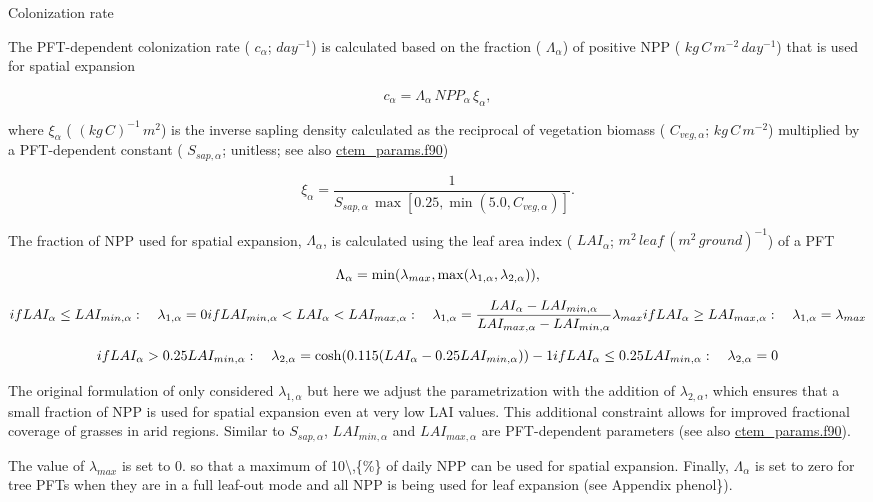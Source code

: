 Colonization rate

The P\+F\+T-\/dependent colonization rate ( $c_\alpha$; $day^{-1}$) is calculated based on the fraction ( $\Lambda_\alpha$) of positive N\+P\+P ( $kg\,C\,m^{-2}\,day^{-1}$) that is used for spatial expansion

\[ \label{c_a} c_\alpha = {\Lambda_\alpha\, NPP_\alpha\,\xi_{\alpha}}, \]

where $\xi_{\alpha}$ ( $(kg\,C)^{-1}\,m^{2}$) is the inverse sapling density calculated as the reciprocal of vegetation biomass ( $C_{veg,\alpha}$; $kg\,C\,m^{-2}$) multiplied by a P\+F\+T-\/dependent constant ( $S_{sap,\alpha}$; unitless; see also \hyperlink{ctem__params_8f90}{ctem\+\_\+params.\+f90})

\[ \label{xi} \xi_{\alpha}=\frac{1}{S_{sap,\alpha}\,\max[0.25,\min(5.0, C_{veg,\alpha})]}. \]

The fraction of N\+P\+P used for spatial expansion, $\Lambda_\alpha$, is calculated using the leaf area index ( ${LAI}_\alpha$; $m^2\,leaf\,(m^{2}\,ground)^{-1}$) of a P\+F\+T

\[ \Lambda_{\alpha}=\min(\lambda_{max}, \max (\lambda_{1,\alpha}, \lambda_{2,\alpha})), \vspace*{-4mm} \]

\[ if LAI_\alpha \leq LAI_{min,\alpha}:\nonumber \\ \quad \lambda_{1,\alpha} =0 \nonumber \\ if LAI_{min,\alpha} < LAI_\alpha < LAI_{max,\alpha}:\nonumber \\ \quad \lambda_{1,\alpha} =\frac{LAI_\alpha - LAI_{min,\alpha}} {LAI_{max,\alpha} - LAI_{min,\alpha}} \lambda_{max} \nonumber \\ if LAI_\alpha \geq LAI_{max,\alpha}:\nonumber \\ \quad \lambda_{1,\alpha} =\lambda_{max} \label{lam1} \vspace*{-4mm} \]

\[ if LAI_\alpha > 0.25 LAI_{min,\alpha}:\nonumber \\ \quad \lambda_{2,\alpha} =\cosh(0.115(LAI_\alpha - 0.25 LAI_{min,\alpha})) - 1 \nonumber \\ if LAI_\alpha \leq 0.25 LAI_{min,\alpha}: \nonumber \\ \quad \lambda_{2,\alpha} = 0\label{lam2} \]

The original formulation of \cite{Arora2006-pp} only considered $\lambda_{1,\alpha}$ but here we adjust the parametrization with the addition of $\lambda_{2,\alpha}$, which ensures that a small fraction of N\+P\+P is used for spatial expansion even at very low L\+A\+I values. This additional constraint allows for improved fractional coverage of grasses in arid regions. Similar to $S_{sap,\alpha}$, $LAI_{min,\alpha}$ and $LAI_{max,\alpha}$ are P\+F\+T-\/dependent parameters (see also \hyperlink{ctem__params_8f90}{ctem\+\_\+params.\+f90}).

The value of $\lambda_{max}$ is set to 0. so that a maximum of 10\textbackslash{},\{\%\} of daily N\+P\+P can be used for spatial expansion. Finally, $\Lambda_\alpha$ is set to zero for tree P\+F\+Ts when they are in a full leaf-\/out mode and all N\+P\+P is being used for leaf expansion (see Appendix phenol\}). 